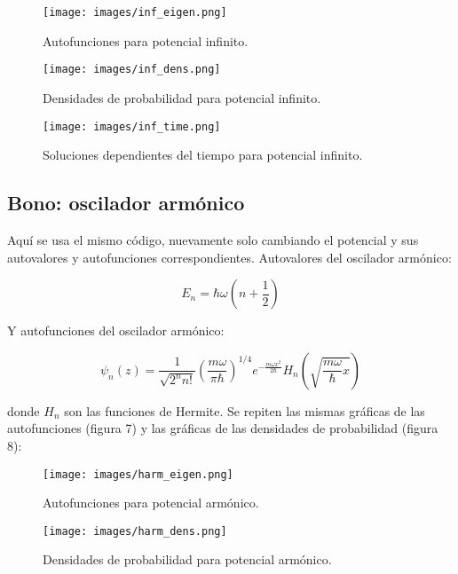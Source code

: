\documentclass{article}
\begin{document}
\begin{figure}
    \texttt{[image: images/inf\_eigen.png]}
    \centering
    \caption{Autofunciones para potencial infinito.}
\end{figure}

\begin{figure}
    \texttt{[image: images/inf\_dens.png]}
    \centering
    \caption{Densidades de probabilidad para potencial infinito.}
\end{figure}

\begin{figure}
    \texttt{[image: images/inf\_time.png]}
    \centering
    \caption{Soluciones dependientes del tiempo para potencial infinito.}
\end{figure}

\subsection{Bono: oscilador armónico}

Aquí se usa el mismo código, nuevamente solo cambiando el potencial y sus autovalores y autofunciones correspondientes. Autovalores del oscilador armónico:

\begin{equation}
    E_n=\hbar\omega(n+\frac{1}{2})
\end{equation}

Y autofunciones del oscilador armónico:

\begin{equation}
    \psi_n(z)=\frac{1}{\sqrt{2^nn!}}\left(\frac{m\omega}{\pi\hbar}\right)^{1/4}e^{-\frac{m\omega x^2}{2\hbar}}H_n\left(\sqrt{\frac{m\omega}{\hbar}x}\right)
\end{equation}

donde $H_n$ son las funciones de Hermite. Se repiten las mismas gráficas de las autofunciones (figura 7) y las gráficas de las densidades de probabilidad (figura 8):

\begin{figure}
    \texttt{[image: images/harm\_eigen.png]}
    \centering
    \caption{Autofunciones para potencial armónico.}
\end{figure}

\begin{figure}
    \texttt{[image: images/harm\_dens.png]}
    \centering
    \caption{Densidades de probabilidad para potencial armónico.}
\end{figure}
\end{document}
